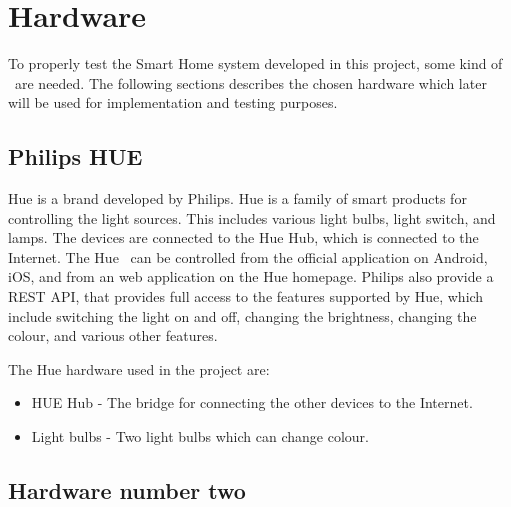 \section{Hardware}\label{sec:hardware}

To properly test the Smart Home system developed in this project, some kind of \sdevs~are needed. The following sections describes the chosen hardware which later will be used for implementation and testing purposes.


\subsection{Philips HUE}
Hue is a brand developed by Philips. Hue is a family of smart products for controlling the light sources. This includes various light bulbs, light switch, and lamps. The devices are connected to the Hue Hub, which is connected to the Internet. The Hue \sdevs~can be controlled from the official application on Android, iOS, and from an web application on the Hue homepage. Philips also provide a REST API, that provides full access to the features supported by Hue, which include switching the light on and off, changing the brightness, changing the colour, and various other features.

The Hue hardware used in the project are:
\begin{itemize}
\item HUE Hub - The bridge for connecting the other devices to the Internet. 
\item Light bulbs - Two light bulbs which can change colour. 
\end{itemize}























\subsection{Hardware number two}